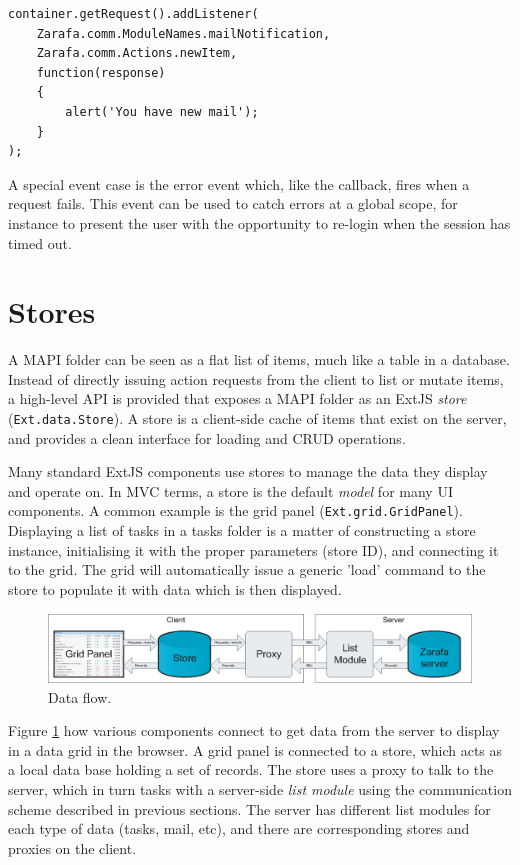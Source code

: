 \begin{lstlisting}[caption={Using callbacks}, label=listing:events]
container.getRequest().addListener(
	Zarafa.comm.ModuleNames.mailNotification,
	Zarafa.comm.Actions.newItem,
	function(response)
	{
		alert('You have new mail');
	}
);
\end{lstlisting}

A special event case is the error event which, like the callback, fires when a request fails. This event
can be used to catch errors at a global scope, for instance to present the user with the opportunity
to re-login when the session has timed out.

\section{Stores}
\label{section:stores}

A MAPI folder can be seen as a flat list of items, much like a table in a database. Instead of directly issuing
action requests from the client to list or mutate items, a high-level API is provided that exposes
a MAPI folder as an ExtJS \emph{store} ({\tt Ext.data.Store}). A store is a client-side cache of items that exist
on the server, and provides a clean interface for loading and CRUD operations. 

Many standard ExtJS components use stores to manage the data they display and operate on. In MVC terms,
a store is the default \emph{model} for many UI components. A common example is the grid panel 
({\tt Ext.grid.GridPanel}). Displaying a list of tasks in a tasks folder is a matter of constructing a 
store instance, initialising it with the proper parameters (store ID), and connecting it to the grid. The
grid will automatically issue a generic 'load' command to the store to populate it with data which
is then displayed. 

\begin{figure}[t!]
\centering
\includegraphics[width=14cm]{figures/store2.eps}
\caption{Data flow.}
\label{figure:stores}
\end{figure}

Figure \ref{figure:stores} how various components connect to get data from the server to display in a 
data grid in the browser. A grid panel is connected to a store, which acts as a local data base holding
a set of records. The store uses a proxy to talk to the server, which in turn tasks with a server-side
\emph{list module} using the communication scheme described in previous sections. The server has different 
list modules for each type of data (tasks, mail, etc), and there are corresponding stores and proxies on 
the client.

